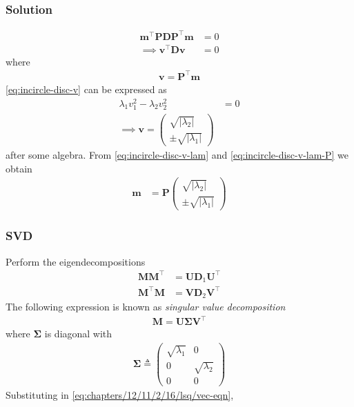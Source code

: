 \documentclass{beamer}
\theoremstyle{remark}
\providecommand{\abs}[1]{\left\vert#1\right\vert}
\newcommand{\myvec}[1]{\ensuremath{\begin{pmatrix}#1\end{pmatrix}}}
\let\vec\mathbf
\begin{document}
\begin{frame}
\frametitle{Solution}
\begin{align}
\vec{m}^{\top}\vec{P}\vec{D}\vec{P}^{\top}\vec{m} &= 0
\\
\implies 
\vec{v}^{\top}\vec{D}\vec{v} &= 0
	\label{eq:incircle-disc-v}
\end{align}
where 
\begin{align}
	\label{eq:incircle-disc-v-lam-P}
\vec{v} = \vec{P}^{\top}\vec{m}
\end{align}
	\eqref{eq:incircle-disc-v}
	can be expressed as 
\begin{align}
\lambda_1 v_1^2
-\lambda_2 v_2^2 &= 0
\\
\implies \vec{v} = \myvec{\sqrt{\abs{\lambda_2}} \\[2mm]  \pm \sqrt{\abs{\lambda_1}}}
	\label{eq:incircle-disc-v-lam}
\end{align}
after some algebra.
From 
	\eqref{eq:incircle-disc-v-lam}
	and
	\eqref{eq:incircle-disc-v-lam-P}
	we obtain 
\begin{align}
  \vec{m}&= \vec{P}\myvec{\sqrt{\abs{\lambda_2}} \\[2mm]  \pm \sqrt{\abs{\lambda_1}}}
	  \label{eq:h-tangents-cond-mPlam}
\end{align}
\end{frame}
\begin{frame}
\frametitle{SVD}
Perform the eigendecompositions 
    \begin{align}
	    \vec{MM}^\top &= \vec{U}\vec{D}_1\vec{U}^\top \label{eq:chapters/12/11/2/16/svd/decomp-1} \\
	    \vec{M}^\top\vec{M} &= \vec{V}\vec{D}_2\vec{V}^\top \label{eq:chapters/12/11/2/16/svd/decomp-2}
    \end{align}
	The following expression is known as {\em singular value decomposition}
    \begin{align}
        \vec{M} = 
	\vec{U}\vec{\Sigma}\vec{V}^\top
        \label{eq:chapters/12/11/2/16/svd/M-svd}
    \end{align}
    where $\vec{\Sigma}$ is diagonal with
    \begin{align}
        \vec{\Sigma} \triangleq \myvec{\sqrt{\lambda_1}&0\\0&\sqrt{\lambda_2}\\0&0}
        \label{eq:chapters/12/11/2/16/svd/svd-params}
    \end{align}
 Substituting in 
        \eqref{eq:chapters/12/11/2/16/lsq/vec-eqn},
\end{frame}
\end{document}

